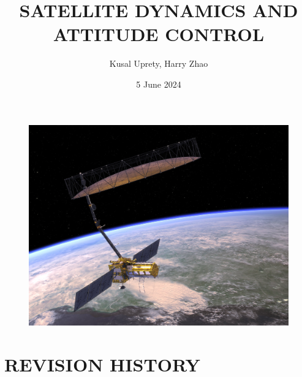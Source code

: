 \documentclass[12pt,a4paper,notitlepage]{article}
\begin{document}
\title{\Huge \textbf{SATELLITE DYNAMICS AND ATTITUDE CONTROL}}
\author{Kusal Uprety, Harry Zhao}
\date{5 June 2024}

\begin{minipage}[h]{\textwidth}
	\vspace{4 cm}
	\advance\leftskip-1in
    \maketitle
\end{minipage}

\begin{figure}[H]
\centering
\includegraphics[scale=0.45]{Images/NISAR.jpg}
\end{figure}

\pagebreak

\section*{\Large REVISION HISTORY}
\end{document}
